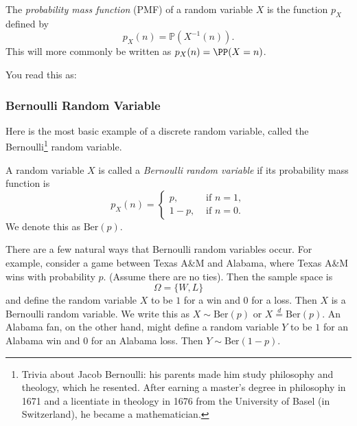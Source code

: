 \documentclass{ximera}
\begin{document}
\begin{definition}
The \textit{probability mass function} (PMF) of a random variable $X$ is the function $p_X$ defined by
$$
p_X(n) = \mathbb{P}(X^{-1}(n)).
$$
This will more commonly be written as $p_X(n) = \PP(X=n)$.
\end{definition}
You read this as:
\begin{center}
\end{center}

\subsubsection{Bernoulli Random Variable}
Here is the most basic example of a discrete random variable, called the Bernoulli\footnote{Trivia about Jacob Bernoulli: his parents made him study philosophy and theology, which he resented. After earning a master's degree in philosophy in 1671 and a licentiate in theology in 1676 from the University of Basel (in Switzerland), he became a mathematician.} random variable.

\begin{definition}
A random variable $X$ is called a \textit{Bernoulli random variable} if its probability mass function is
$$
p_X(n)
= 
\begin{cases}
p, & \text{ if } n=1,\\
1-p, & \text{ if } n=0.
\end{cases}
$$
We denote this as $\text{Ber}(p)$.
\end{definition}

There are a few natural ways that Bernoulli random variables occur. For example, consider a game between Texas A\&M and Alabama, where Texas A\&M wins with probability $p$. (Assume there are no ties). Then the sample space is
$$
\Omega = \{W,L\}
$$
and define the random variable $X$ to be $1$ for a win and $0$ for a loss. Then $X$ is a Bernoulli random variable. We write this as $X \sim \text{Ber}(p)$ or $X\stackrel{d}{=} \text{Ber}(p)$. An Alabama fan, on the other hand, might define a random variable $Y$ to be $1$ for an Alabama win and $0$ for an Alabama loss. Then $Y \sim \text{Ber}(1-p)$.
\end{document}
